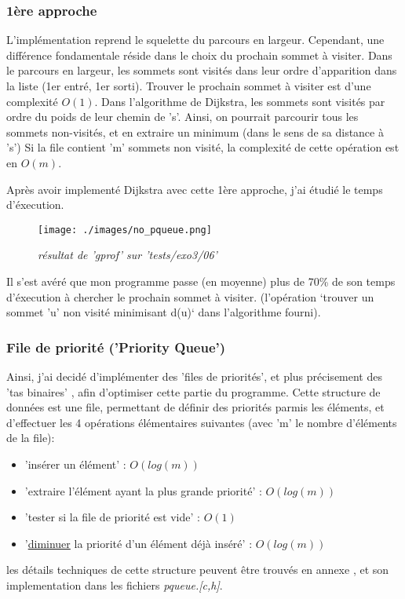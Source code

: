 \documentclass[10pt]{article}
\begin{document}
			\subsubsection{1ère approche}
				L'implémentation reprend le squelette du parcours en largeur.
				Cependant, une différence fondamentale réside dans le choix du prochain sommet à visiter.
				Dans le parcours en largeur, les sommets sont visités dans leur ordre d'apparition dans la liste (1er entré, 1er sorti).
				Trouver le prochain sommet à visiter est d'une complexité \(O(1)\).
				Dans l'algorithme de Dijkstra, les sommets sont visités par ordre du poids de leur chemin de 's'.
				Ainsi, on pourrait parcourir tous les sommets non-visités, et en extraire un minimum (dans le sens de sa distance à 's')
				Si la file contient 'm' sommets non visité, la complexité de cette opération est en \(O(m)\).
				
				Après avoir implementé Dijkstra avec cette 1ère approche, j'ai étudié le temps d'éxecution.
				\begin{figure}[H]
					\begin{center}
						\texttt{[image: ./images/no\_pqueue.png]}
					\end{center}
				    \caption{\textit{résultat de 'gprof' sur 'tests/exo3/06'}}
				\end{figure}
				Il s'est avéré que mon programme passe (en moyenne) plus de 70\% de
				son temps d'éxecution à chercher le prochain sommet à visiter.
				(l'opération `trouver un sommet 'u' non visité minimisant d(u)` dans l'algorithme fourni).\newline

			\subsubsection{File de priorité ('Priority Queue')}

				Ainsi, j'ai decidé d'implémenter des 'files de priorités', et plus précisement des
				'tas binaires' \cite{binary_heap}, afin d'optimiser cette partie du programme.
				Cette structure de données est une file, permettant de définir des priorités parmis les éléments,
				et d'effectuer les 4 opérations élémentaires suivantes (avec 'm' le nombre d'éléments de la file):
				\begin{itemize}[label=-]
					\item 'insérer un élément' : \(O(log(m))\)
					\item 'extraire l'élément ayant la plus grande priorité' : \({O(log(m))}\)
					\item 'tester si la file de priorité est vide' : \(O(1)\)
					\item '\underline{diminuer} la priorité d'un élément déjà inséré' : \(O(log(m))\)
				\end{itemize}
				les détails techniques de cette structure peuvent être trouvés en annexe \cite{binary_heap},
				et son implementation dans les fichiers \textit{pqueue.[c,h]}.
				
\end{document}
